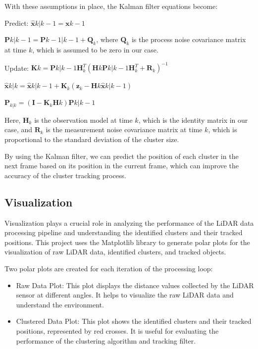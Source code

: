 \documentclass[journal]{IEEEtran} %
\begin{document}
With these assumptions in place, the Kalman filter equations become:

Predict:
$\hat{\mathbf{x}}{k|k-1} = \mathbf{x}{k-1}$

$\mathbf{P}{k|k-1} = \mathbf{P}{k-1|k-1} + \mathbf{Q}_k$, where $\mathbf{Q}_k$ is the process noise covariance matrix at time $k$, which is assumed to be zero in our case.

Update:
$\mathbf{K}k = \mathbf{P}{k|k-1} \mathbf{H}_k^T (\mathbf{H}k \mathbf{P}{k|k-1} \mathbf{H}_k^T + \mathbf{R}_k)^{-1}$

$\hat{\mathbf{x}}{k|k} = \hat{\mathbf{x}}{k|k-1} + \mathbf{K}_k (\mathbf{z}_k - \mathbf{H}k \hat{\mathbf{x}}{k|k-1})$

$\mathbf{P}_{k|k} = (\mathbf{I} - \mathbf{K}_k \mathbf{H}k) \mathbf{P}{k|k-1}$

Here, $\mathbf{H}_k$ is the observation model at time $k$, which is the identity matrix in our case, and $\mathbf{R}_k$ is the measurement noise covariance matrix at time $k$, which is proportional to the standard deviation of the cluster size.

By using the Kalman filter, we can predict the position of each cluster in the next frame based on its position in the current frame, which can improve the accuracy of the cluster tracking process.



\subsection{Visualization}

Visualization plays a crucial role in analyzing the performance of the LiDAR data processing pipeline and understanding the identified clusters and their tracked positions. This project uses the Matplotlib library to generate polar plots for the visualization of raw LiDAR data, identified clusters, and tracked objects.

Two polar plots are created for each iteration of the processing loop:
\begin{itemize}

\item Raw Data Plot: This plot displays the distance values collected by the LiDAR sensor at different angles. It helps to visualize the raw LiDAR data and understand the environment.

\item Clustered Data Plot: This plot shows the identified clusters and their tracked positions, represented by red crosses. It is useful for evaluating the performance of the clustering algorithm and tracking filter.

\end{itemize}
\end{document}
